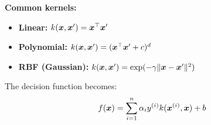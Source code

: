 \textbf{Common kernels:}
\begin{itemize}
    \item \textbf{Linear:} $k(\boldsymbol{x}, \boldsymbol{x}') = \boldsymbol{x}^\top \boldsymbol{x}'$
    \item \textbf{Polynomial:} $k(\boldsymbol{x}, \boldsymbol{x}') = (\boldsymbol{x}^\top \boldsymbol{x}' + c)^d$
    \item \textbf{RBF (Gaussian):} $k(\boldsymbol{x}, \boldsymbol{x}') = \exp(-\gamma \|\boldsymbol{x} - \boldsymbol{x}'\|^2)$
\end{itemize}

The decision function becomes:
\begin{equation}
f(\boldsymbol{x}) = \sum_{i=1}^{n} \alpha_i y^{(i)} k(\boldsymbol{x}^{(i)}, \boldsymbol{x}) + b
\end{equation}

